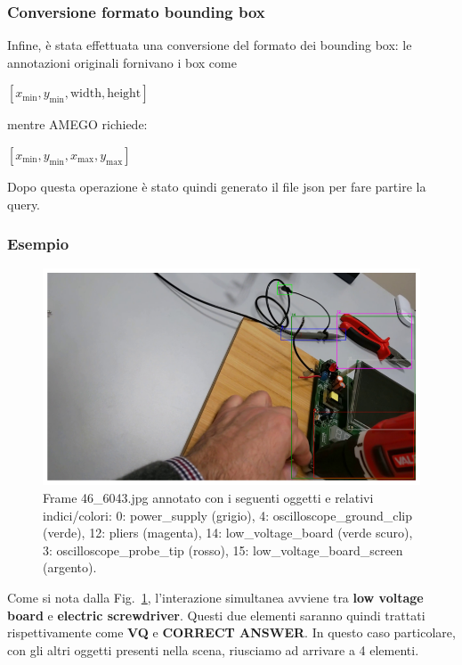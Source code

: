 \subsubsection*{Conversione formato bounding box}
Infine, è stata effettuata una conversione del formato dei bounding box: le annotazioni originali fornivano i box come 
\begin{center}
\([x_\text{min}, y_\text{min}, \text{width}, \text{height}]\)
\end{center}

mentre AMEGO richiede:
\begin{center}
\([x_\text{min}, y_\text{min}, x_\text{max}, y_\text{max}]\)
\end{center}

Dopo questa operazione è stato quindi generato il file json per fare partire la query.


\subsubsection*{Esempio}
\begin{figure}[h!]
    \centering
    \includegraphics[width=1\linewidth]{Images/q5_ex_annotations.png}
    \caption{
        Frame 46\_6043.jpg annotato con i seguenti oggetti e relativi indici/colori: 
        0: power\_supply (grigio), 
        4: oscilloscope\_ground\_clip (verde), 
        12: pliers (magenta), 
        14: low\_voltage\_board (verde scuro), 
        3: oscilloscope\_probe\_tip (rosso), 
        15: low\_voltage\_board\_screen (argento).
    }
    \label{fig:q5ex}

\end{figure}

Come si nota dalla Fig.~\ref{fig:q5ex}, l'interazione simultanea avviene tra \textbf{low voltage board} e \textbf{electric screwdriver}. Questi due elementi saranno quindi trattati rispettivamente come \textbf{VQ} e \textbf{CORRECT ANSWER}. In questo caso particolare, con gli altri oggetti presenti nella scena, riusciamo ad arrivare a 4 elementi.

